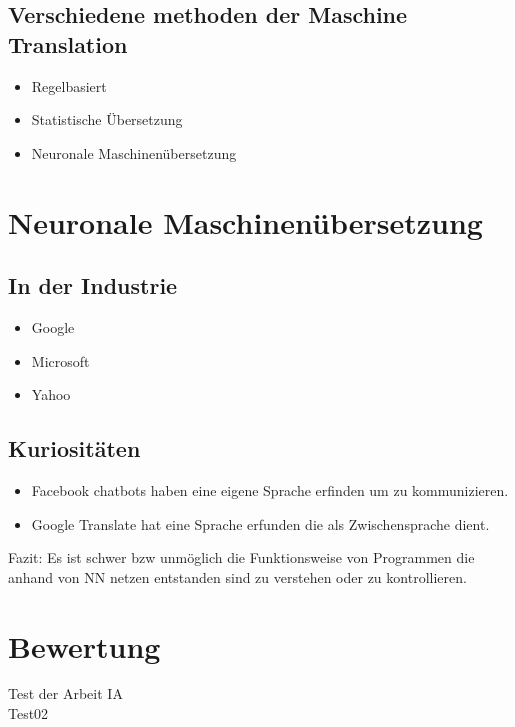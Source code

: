\documentclass{thesisclass}
\begin{document}
\subsection{Verschiedene methoden der Maschine Translation}
\begin{itemize}
	\item Regelbasiert
	\item Statistische Übersetzung
	\item Neuronale Maschinenübersetzung
\end{itemize}
\newpage
\section{Neuronale Maschinenübersetzung}
\subsection{In der Industrie}
\begin{itemize}
	\item Google
	\item Microsoft
	\item Yahoo
\end{itemize}
\subsection{Kuriositäten}
\begin{itemize}
	\item Facebook chatbots haben eine eigene Sprache erfinden um zu kommunizieren.
	\item Google Translate hat eine Sprache erfunden die als Zwischensprache dient.
\end{itemize}
Fazit: Es ist schwer bzw unmöglich die Funktionsweise von Programmen die anhand von NN netzen entstanden sind zu verstehen oder zu kontrollieren.
\section{Bewertung}

\mainmatter
{}

Test der Arbeit \gls{IA} \cite{gassist} \\
Test02 \cite{inspirobot}

\cleardoublepage
{}
{}

{}	%
{}	%




%


\cleardoublepage
\printglossary
\end{document}
